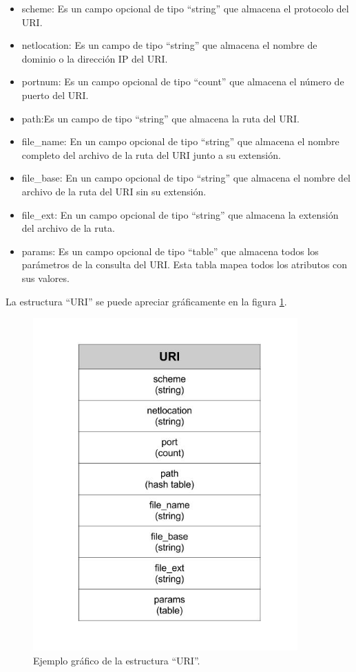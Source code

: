 \begin{itemize}
\item scheme: Es un campo opcional de tipo ``string'' que almacena el protocolo del URI.

\item netlocation: Es un campo de tipo ``string'' que almacena el nombre de dominio o la dirección IP del URI.

\item portnum: Es un campo opcional de tipo ``count''  que almacena el número de puerto del URI.
\item path:Es un campo de tipo ``string'' que almacena la ruta del URI.

\item file\_name: En un campo opcional de tipo ``string'' que almacena el nombre completo  del archivo de la ruta del URI junto a su extensión.

\item file\_base: En un campo opcional de tipo ``string'' que almacena el nombre  del archivo de la ruta del URI sin su extensión.

\item file\_ext: En un campo opcional de tipo ``string'' que almacena la extensión del archivo de la ruta.

\item params: Es un campo opcional de tipo ``table'' que almacena todos los parámetros de la consulta del URI. Esta tabla mapea todos los atributos con sus valores.

\end{itemize}

La estructura ``URI'' se puede apreciar gráficamente en la figura \ref{fig:URI}.

\begin{figure}[!htb]
\begin{center}
\includegraphics[width=4in]{./img/URIstruct.jpg}
\caption{Ejemplo gráfico de la estructura ``URI''.}
\label{fig:URI}
\end{center}
\end{figure}	

